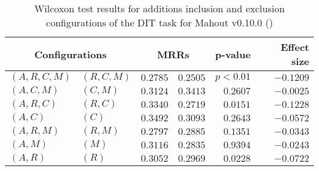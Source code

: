 
\begin{table}
\begin{spacing}{1.2}
\centering
\caption{Wilcoxon test results for additions inclusion and exclusion configurations of the DIT task for Mahout v0.10.0 (\ctwo)}
\label{table:versus-wilcox-mahout-dit-additions}
\begin{tabular}{ll|rr|rr}
\toprule
      \multicolumn{2}{c|}{Configurations} &                \multicolumn{2}{c|}{MRRs} &             p-value & Effect size \\
\midrule
 $(A,R,C,M)$ &  $(R,C,M)$ &  $\bm{0.2785}$ &       $0.2505$ & $p<0.01$ &   $-0.1209$ \\
   $(A,C,M)$ &    $(C,M)$ &       $0.3124$ &  $\bm{0.3413}$ & $0.2607$ &   $-0.0025$ \\
   $(A,R,C)$ &    $(R,C)$ &  $\bm{0.3340}$ &       $0.2719$ & $0.0151$ &   $-0.1228$ \\
     $(A,C)$ &      $(C)$ &  $\bm{0.3492}$ &       $0.3093$ & $0.2643$ &   $-0.0572$ \\
   $(A,R,M)$ &    $(R,M)$ &       $0.2797$ &  $\bm{0.2885}$ & $0.1351$ &   $-0.0343$ \\
     $(A,M)$ &      $(M)$ &  $\bm{0.3116}$ &       $0.2835$ & $0.9394$ &   $-0.0243$ \\
     $(A,R)$ &      $(R)$ &  $\bm{0.3052}$ &       $0.2969$ & $0.0228$ &   $-0.0722$ \\
\bottomrule
\end{tabular}

\end{spacing}
\end{table}

